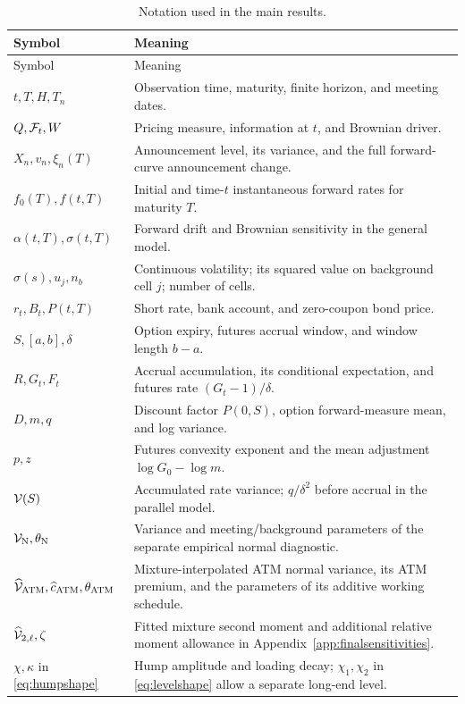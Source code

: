 \begin{longtable}{p{}p{}}
\caption{Notation used in the main results.}\label{tab:notation}\\
\toprule Symbol & Meaning\\\midrule\endfirsthead
\toprule Symbol & Meaning\\\midrule\endhead
$t,T,H,T_n$ & Observation time, maturity, finite horizon, and meeting dates.\\
$Q,\mathcal F_t,W$ & Pricing measure, information at $t$, and Brownian driver.\\
$X_n,v_n,\xi_n(T)$ & Announcement level, its variance, and the full forward-curve announcement change.\\
$f_0(T),f(t,T)$ & Initial and time-$t$ instantaneous forward rates for maturity $T$.\\
$\alpha(t,T),\sigma(t,T)$ & Forward drift and Brownian sensitivity in the general model.\\
$\sigma(s),u_j,n_b$ & Continuous volatility; its squared value on background cell $j$; number of cells.\\
$r_t,B_t,P(t,T)$ & Short rate, bank account, and zero-coupon bond price.\\
$S,[a,b],\delta$ & Option expiry, futures accrual window, and window length $b-a$.\\
$R,G_t,F_t$ & Accrual accumulation, its conditional expectation, and futures rate $(G_t-1)/\delta$.\\
$D,m,q$ & Discount factor $P(0,S)$, option forward-measure mean, and log variance.\\
$p,z$ & Futures convexity exponent and the mean adjustment $\log G_0-\log m$.\\
$\mathcal V(S)$ & Accumulated rate variance; $q/\delta^2$ before accrual in the parallel model.\\
$\mathcal V_{\mathrm N},\theta_{\mathrm N}$ & Variance and meeting/background parameters of the separate empirical normal diagnostic.\\
$\widehat{\mathcal V}_{\rm ATM},\widehat c_{\rm ATM},\theta_{\rm ATM}$ & Mixture-interpolated ATM normal variance, its ATM premium, and the parameters of its additive working schedule.\\
$\widehat{\mathcal V}_{2,\ell},\zeta$ & Fitted mixture second moment and additional relative moment allowance in Appendix~\ref{app:finalsensitivities}.\\
$\chi,\kappa$ in \eqref{eq:humpshape} & Hump amplitude and loading decay; $\chi_1,\chi_2$ in \eqref{eq:levelshape} allow a separate long-end level.\\

\end{longtable}
